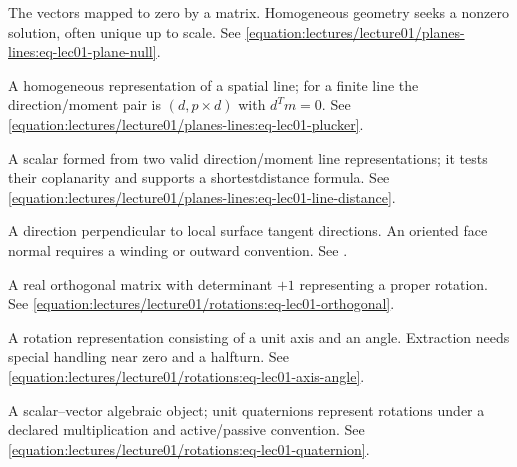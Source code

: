 \documentclass[letterpaper,11pt,english,openany,oneside]{jupyterBook}
\begin{document}
\begin{description}
\sphinxAtStartPar
The vectors mapped to zero by a matrix. Homogeneous geometry seeks a nonzero solution, often unique up to scale. See \eqref{equation:lectures/lecture01/planes-lines:eq-lec01-plane-null}.

\sphinxAtStartPar
A homogeneous representation of a spatial line; for a finite line the direction/moment pair is \((d,p\times d)\) with \(d^Tm=0\). See \eqref{equation:lectures/lecture01/planes-lines:eq-lec01-plucker}.

\sphinxAtStartPar
A scalar formed from two valid direction/moment line representations; it tests their coplanarity and supports a shortest\sphinxhyphen{}distance formula. See \eqref{equation:lectures/lecture01/planes-lines:eq-lec01-line-distance}.

\sphinxAtStartPar
A direction perpendicular to local surface tangent directions. An oriented face normal requires a winding or outward convention. See {\hyperref[\detokenize{lectures/lecture01/quiz-workbook:ex-lec01-tetrahedron}]{}}.

\sphinxAtStartPar
A real orthogonal matrix with determinant \(+1\) representing a proper rotation. See \eqref{equation:lectures/lecture01/rotations:eq-lec01-orthogonal}.

\sphinxAtStartPar
A rotation representation consisting of a unit axis and an angle. Extraction needs special handling near zero and a half\sphinxhyphen{}turn. See \eqref{equation:lectures/lecture01/rotations:eq-lec01-axis-angle}.

\sphinxAtStartPar
A scalar–vector algebraic object; unit quaternions represent rotations under a declared multiplication and active/passive convention. See \eqref{equation:lectures/lecture01/rotations:eq-lec01-quaternion}.


\end{description}
\end{document}
